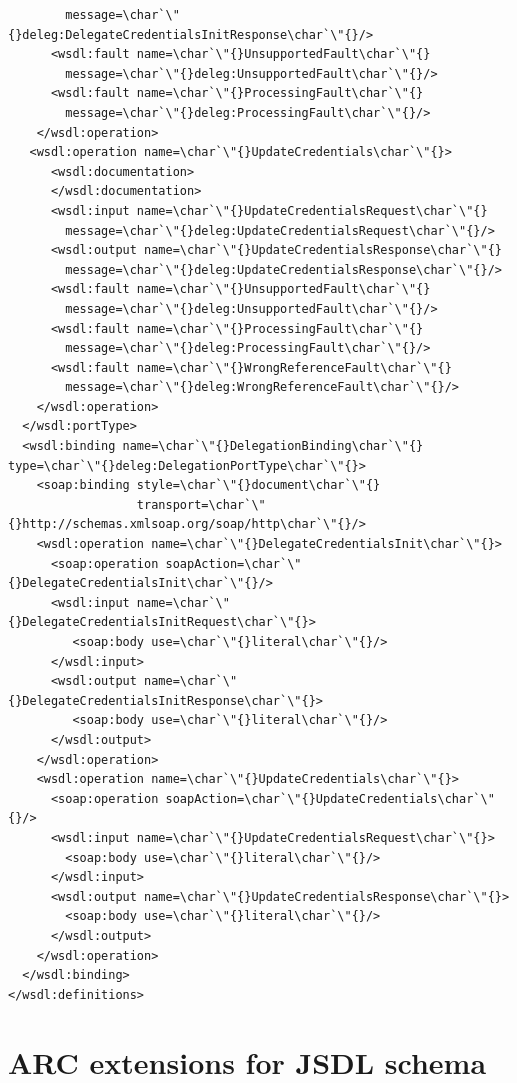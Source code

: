 \documentclass{article}                            %
\begin{document}
\begin{footnotesize}
\begin{verbatim}
        message=\char`\"{}deleg:DelegateCredentialsInitResponse\char`\"{}/>
      <wsdl:fault name=\char`\"{}UnsupportedFault\char`\"{}
        message=\char`\"{}deleg:UnsupportedFault\char`\"{}/>
      <wsdl:fault name=\char`\"{}ProcessingFault\char`\"{}
        message=\char`\"{}deleg:ProcessingFault\char`\"{}/>
    </wsdl:operation>
   <wsdl:operation name=\char`\"{}UpdateCredentials\char`\"{}>
      <wsdl:documentation>
      </wsdl:documentation>
      <wsdl:input name=\char`\"{}UpdateCredentialsRequest\char`\"{}
        message=\char`\"{}deleg:UpdateCredentialsRequest\char`\"{}/>
      <wsdl:output name=\char`\"{}UpdateCredentialsResponse\char`\"{}
        message=\char`\"{}deleg:UpdateCredentialsResponse\char`\"{}/>
      <wsdl:fault name=\char`\"{}UnsupportedFault\char`\"{}
        message=\char`\"{}deleg:UnsupportedFault\char`\"{}/>
      <wsdl:fault name=\char`\"{}ProcessingFault\char`\"{}
        message=\char`\"{}deleg:ProcessingFault\char`\"{}/>
      <wsdl:fault name=\char`\"{}WrongReferenceFault\char`\"{}
        message=\char`\"{}deleg:WrongReferenceFault\char`\"{}/>
    </wsdl:operation>
  </wsdl:portType>
  <wsdl:binding name=\char`\"{}DelegationBinding\char`\"{} type=\char`\"{}deleg:DelegationPortType\char`\"{}>
    <soap:binding style=\char`\"{}document\char`\"{}
                  transport=\char`\"{}http://schemas.xmlsoap.org/soap/http\char`\"{}/>
    <wsdl:operation name=\char`\"{}DelegateCredentialsInit\char`\"{}>
      <soap:operation soapAction=\char`\"{}DelegateCredentialsInit\char`\"{}/>
      <wsdl:input name=\char`\"{}DelegateCredentialsInitRequest\char`\"{}>
         <soap:body use=\char`\"{}literal\char`\"{}/>
      </wsdl:input>
      <wsdl:output name=\char`\"{}DelegateCredentialsInitResponse\char`\"{}>
         <soap:body use=\char`\"{}literal\char`\"{}/>
      </wsdl:output>
    </wsdl:operation>
    <wsdl:operation name=\char`\"{}UpdateCredentials\char`\"{}>
      <soap:operation soapAction=\char`\"{}UpdateCredentials\char`\"{}/>
      <wsdl:input name=\char`\"{}UpdateCredentialsRequest\char`\"{}>
        <soap:body use=\char`\"{}literal\char`\"{}/>
      </wsdl:input>
      <wsdl:output name=\char`\"{}UpdateCredentialsResponse\char`\"{}>
        <soap:body use=\char`\"{}literal\char`\"{}/>
      </wsdl:output>
    </wsdl:operation>
  </wsdl:binding>
</wsdl:definitions>
\end{verbatim}
\end{footnotesize}

\section{ARC extensions for JSDL schema\label{annex:jsdl-extension}}
\end{document}
